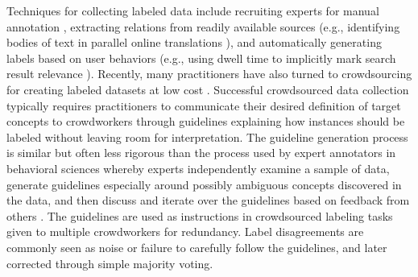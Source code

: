 Techniques for collecting labeled data include recruiting experts for manual annotation \cite{taylor2003penn}, extracting relations from readily available sources (e.g., identifying bodies of text in parallel online translations \cite{Resnik:2003:WPC:964751.964753,Chang:2012:LFT:2390665.2390698}), and automatically generating labels based on user behaviors (e.g., using dwell time to implicitly mark search result relevance \cite{agichtein2006improving}). Recently, many practitioners have also turned to crowdsourcing for creating labeled datasets at low cost \cite{Snow:2008:CFG:1613715.1613751}. Successful crowdsourced data collection typically requires practitioners to communicate their desired definition of target concepts to crowdworkers through guidelines 
explaining how instances should be labeled without leaving room for interpretation. %
The guideline generation process is similar but often less rigorous than the process used by expert annotators in behavioral sciences \cite{macqueen1998codebook, weston2001analyzing} whereby experts independently examine a sample of data, generate guidelines especially around possibly ambiguous concepts discovered in the data, and then discuss and iterate over the guidelines based on feedback from others \cite{kulesza2014structured}. The guidelines are used as instructions in crowdsourced labeling tasks given to multiple crowdworkers for redundancy. Label disagreements are commonly seen as noise or failure to carefully follow the guidelines, and later corrected through simple majority voting.


